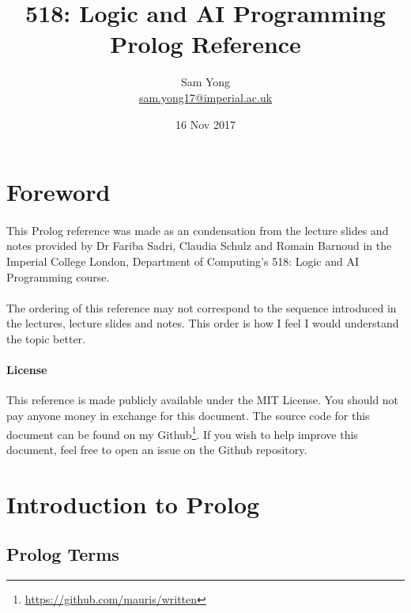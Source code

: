 \documentclass{article}
\title{
	 \large 518: Logic and AI Programming \\
	 \huge Prolog Reference
}
\date{16 Nov 2017}
\author{
	Sam Yong \\
	\small \href{mailto:sam.yong17@imperial.ac.uk}{sam.yong17@imperial.ac.uk}
}
\begin{document}
  \maketitle
  
  \begin{multicols}{2}
  
  \section*{Foreword}  
  
  \paragraph{} This Prolog reference was made as an condensation from the lecture slides and notes provided by Dr Fariba Sadri, Claudia Schulz and Romain Barnoud in the Imperial College London, Department of Computing's 518: Logic and AI Programming course.
  
  \paragraph{} The ordering of this reference may not correspond to the sequence introduced in the lectures, lecture slides and notes. This order is how I feel I would understand the topic better.
  
  \begin{footnotesize}
  \paragraph{License} This reference is made publicly available under the MIT License. You should not pay anyone money in exchange for this document. The source code for this document can be found on my Github\footnote{\href{https://github.com/mauris/written}{https://github.com/mauris/written}}. If you wish to help improve this document, feel free to open an issue on the Github repository.
  \end{footnotesize}
  
  \section{Introduction to Prolog}    
  
  \subsection{Prolog Terms}
  

\end{multicols}
\end{document}
